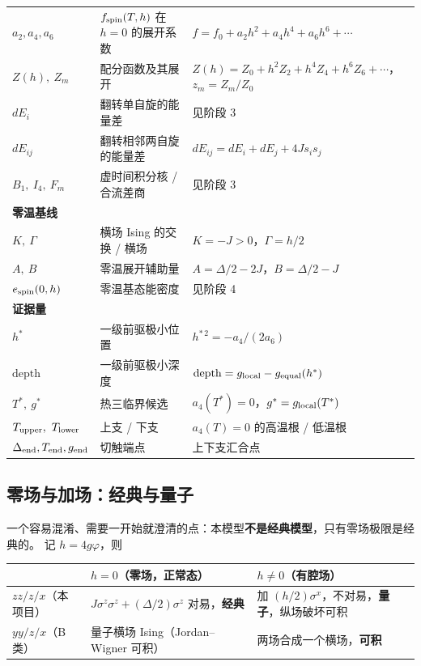 \documentclass[UTF8,11pt,a4paper]{ctexart}
\begin{document}
{\begin{longtable}{@{}p{2.1cm}p{6.0cm}p{6.2cm}@{}}
$a_2,a_4,a_6$ & $f_{\rm spin}(T,h)$ 在 $h=0$ 的展开系数 & $f=f_0+a_2h^2+a_4h^4+a_6h^6+\cdots$ \\
$Z(h),\ Z_m$ & 配分函数及其展开 & $Z(h)=Z_0+h^2Z_2+h^4Z_4+h^6Z_6+\cdots$，$z_m=Z_m/Z_0$ \\
$dE_i$ & 翻转单自旋的能量差 & 见阶段 3 \\
$dE_{ij}$ & 翻转相邻两自旋的能量差 & $dE_{ij}=dE_i+dE_j+4Js_is_j$ \\
$B_1,\ I_4,\ F_m$ & 虚时间积分核 / 合流差商 & 见阶段 3 \\
\midrule
\multicolumn{3}{l}{\textbf{零温基线}} \\
$K,\ \Gamma$ & 横场 Ising 的交换 / 横场 & $K=-J>0$，$\Gamma=h/2$ \\
$A,\ B$ & 零温展开辅助量 & $A=\Delta/2-2J$，$B=\Delta/2-J$ \\
$e_{\rm spin}(0,h)$ & 零温基态能密度 & 见阶段 4 \\
\midrule
\multicolumn{3}{l}{\textbf{证据量}} \\
$h^\ast$ & 一级前驱极小位置 & $h^{\ast\,2}=-a_4/(2a_6)$ \\
$\mathrm{depth}$ & 一级前驱极小深度 & $\mathrm{depth}=g_{\rm local}-g_{\rm equal}(h^\ast)$ \\
$T^\ast,\ g^\ast$ & 热三临界候选 & $a_4(T^\ast)=0$，$g^\ast=g_{\rm local}(T^\ast)$ \\
$T_{\rm upper},\ T_{\rm lower}$ & 上支 / 下支 & $a_4(T)=0$ 的高温根 / 低温根 \\
$\Delta_{\rm end},T_{\rm end},g_{\rm end}$ & 切触端点 & 上下支汇合点 \\
\bottomrule
\end{longtable}
}

\subsection{零场与加场：经典与量子}

一个容易混淆、需要一开始就澄清的点：本模型\textbf{不是经典模型}，只有零场极限是经典的。
记 $h=4g\varphi$，则

\begin{center}
\begin{tabular}{lll}
\toprule
& $h=0$（零场，正常态） & $h\neq0$（有腔场） \\
\midrule
$zz/z/x$（本项目） & $J\sigma^z\sigma^z+(\Delta/2)\sigma^z$ 对易，\textbf{经典} & 加 $(h/2)\sigma^x$，不对易，\textbf{量子}，纵场破坏可积 \\
$yy/z/x$（B 类） & 量子横场 Ising（Jordan--Wigner 可积） & 两场合成一个横场，\textbf{可积} \\
\bottomrule
\end{tabular}
\end{center}
\end{document}

